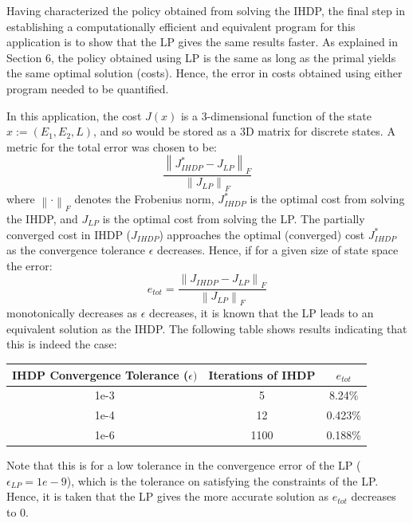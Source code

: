 \documentclass[conference]{IEEEtran}
\newcommand{\norm}[1]{\left\lVert#1\right\rVert}
\begin{document}
Having characterized the policy obtained from solving the IHDP, the final step in establishing a computationally efficient and equivalent program for this application is to show that the LP gives the same results faster. As explained in Section 6, the policy obtained using LP is the same as long as the primal yields the same optimal solution (costs). Hence, the error in costs obtained using either program needed to be quantified.

In this application, the cost $J(x)$ is a 3-dimensional function of the state $x:=(E_{1},E_{2},L)$, and so would be stored as a 3D matrix for discrete states. A metric for the total error was chosen to be:
\begin{displaymath}
    \frac{\norm{J^{*}_{IHDP}-J_{LP}}_{F}}{\norm{J_{LP}}_{F}}
\end{displaymath} where $\norm{\cdot}_{F}$ denotes the Frobenius norm, $J^{*}_{IHDP}$ is the optimal cost from solving the IHDP, and $J_{LP}$ is the optimal cost from solving the LP. The partially converged cost in IHDP ($J_{IHDP}$) approaches the optimal (converged) cost $J^{*}_{IHDP}$ as the convergence tolerance $\epsilon$ decreases. Hence, if for a given size of state space the error:
\begin{displaymath}
    e_{tot}=\frac{\norm{J_{IHDP}-J_{LP}}_{F}}{\norm{J_{LP}}_{F}}
\end{displaymath} monotonically decreases as $\epsilon$ decreases, it is known that the LP leads to an equivalent solution as the IHDP. The following table shows results indicating that this is indeed the case:
\begin{table}[htbp]
	\begin{center}
		\begin{tabular}{|c|c|c|}
			\hline
			\textbf{IHDP Convergence Tolerance ($\epsilon)$}&\textbf{Iterations of IHDP}&\textbf{$e_{tot}$} \\
			\hline
			1e-3& 5 & 8.24\% \\
			\hline
			1e-4& 12 & 0.423\% \\
			\hline
			1e-6& 1100 & 0.188\% \\
			\hline
		\end{tabular}
		\label{tab1}
	\end{center}
\end{table} Note that this is for a low tolerance in the convergence error of the LP ($\epsilon_{LP}=1e-9$), which is the tolerance on satisfying the constraints of the LP. Hence, it is taken that the LP gives the more accurate solution as $e_{tot}$ decreases to 0.
\end{document}
